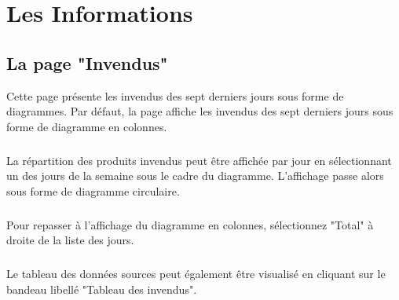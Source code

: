 \chapter{Les Informations}

\section{La page "Invendus"}
Cette page présente les invendus des sept derniers jours sous forme de
diagrammes.
Par défaut, la page affiche les invendus des sept derniers jours sous forme
de diagramme en colonnes.

\paragraph{}
La répartition des produits invendus peut être
affichée par jour en sélectionnant un des jours de la semaine sous le cadre
du diagramme. L'affichage passe alors sous forme de diagramme circulaire.

\paragraph{}
Pour repasser à l'affichage du diagramme en colonnes, sélectionnez "Total" à
droite de la liste des jours.

\paragraph{}
Le tableau des données sources peut également être visualisé en cliquant sur le
bandeau libellé "Tableau des invendus".